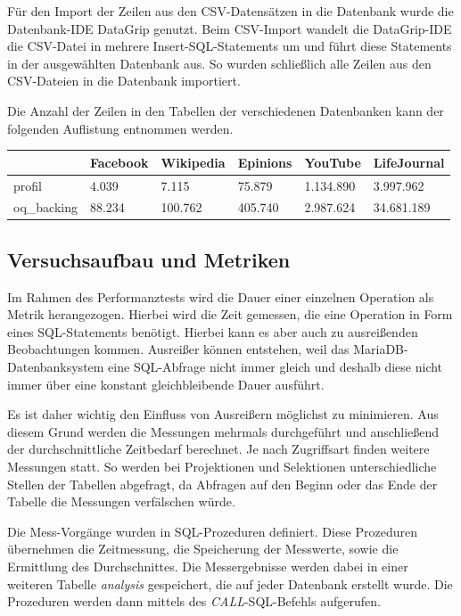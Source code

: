 Für den Import der Zeilen aus den CSV-Datensätzen in die Datenbank wurde die Datenbank-IDE DataGrip genutzt. Beim CSV-Import wandelt die DataGrip-IDE die CSV-Datei in mehrere Insert-SQL-Statements um und führt diese Statements in der ausgewählten Datenbank aus. So wurden schließlich alle Zeilen aus den CSV-Dateien in die Datenbank importiert.

Die Anzahl der Zeilen in den Tabellen der verschiedenen Datenbanken kann der folgenden Auflistung entnommen werden.

\begin{center}
	\begin{tabular}{l|l l l l l }
		& Facebook & Wikipedia & Epinions & YouTube & LifeJournal \\
		\hline
		profil & 4.039 & 7.115 & 75.879 & 1.134.890 & 3.997.962 \\
		oq\_backing & 88.234 & 100.762 & 405.740 & 2.987.624 & 34.681.189 \\
	\end{tabular}
\end{center}

\subsection{Versuchsaufbau und Metriken}

Im Rahmen des Performanztests wird die Dauer einer einzelnen Operation als Metrik herangezogen. Hierbei wird die Zeit gemessen, die eine Operation in Form eines SQL-Statements benötigt. Hierbei kann es aber auch zu ausreißenden Beobachtungen kommen. Ausreißer können entstehen, weil das MariaDB-Datenbanksystem eine SQL-Abfrage nicht immer gleich und deshalb diese nicht immer über eine konstant gleichbleibende Dauer ausführt.

Es ist daher wichtig den Einfluss von Ausreißern möglichst zu minimieren. Aus diesem Grund werden die Messungen mehrmals durchgeführt und anschließend der durchschnittliche Zeitbedarf berechnet. Je nach Zugriffsart finden weitere Messungen statt. So werden bei Projektionen und Selektionen unterschiedliche Stellen der Tabellen abgefragt, da Abfragen auf den Beginn oder das Ende der Tabelle die Messungen verfälschen würde.

Die Mess-Vorgänge wurden in SQL-Prozeduren definiert. Diese Prozeduren übernehmen die Zeitmessung, die Speicherung der Messwerte, sowie die Ermittlung des Durchschnittes. Die Messergebnisse werden dabei in einer weiteren Tabelle \emph{analysis} gespeichert, die auf jeder Datenbank erstellt wurde. Die Prozeduren werden dann mittels des \emph{CALL}-SQL-Befehls aufgerufen.

